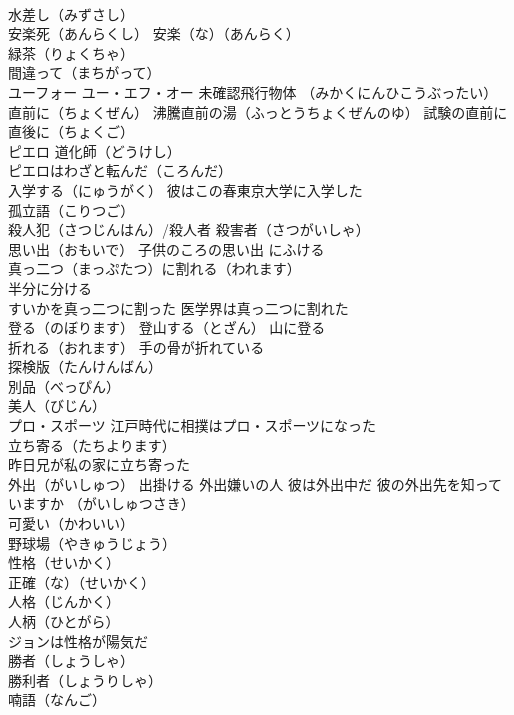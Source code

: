 \documentclass[8pt]{extreport}
\begin{document}
\begin{CJK}{UTF8}{min}
\\	水差し（みずさし）
\\	安楽死（あんらくし） 安楽（な）（あんらく）
\\	緑茶（りょくちゃ）
\\	間違って（まちがって）
\\	ユーフォー ユー・エフ・オー 未確認飛行物体 （みかくにんひこうぶったい） 
\\	直前に（ちょくぜん） 沸騰直前の湯（ふっとうちょくぜんのゆ） 試験の直前に 直後に（ちょくご）
\\	ピエロ 道化師（どうけし）
\\	ピエロはわざと転んだ（ころんだ）
\\	入学する（にゅうがく） 彼はこの春東京大学に入学した
\\	孤立語（こりつご）
\\	殺人犯（さつじんはん）/殺人者 殺害者（さつがいしゃ）
\\	思い出（おもいで） 子供のころの思い出 にふける
\\	真っ二つ（まっぷたつ）に割れる（われます）
\\	半分に分ける
\\	すいかを真っ二つに割った 医学界は真っ二つに割れた
\\	登る（のぼります） 登山する（とざん） 山に登る
\\	折れる（おれます） 手の骨が折れている
\\	探検版（たんけんばん）
\\	別品（べっぴん）
\\	美人（びじん）
\\	プロ・スポーツ 江戸時代に相撲はプロ・スポーツになった
\\	立ち寄る（たちよります） 
\\	昨日兄が私の家に立ち寄った
\\	外出（がいしゅつ） 出掛ける 外出嫌いの人 彼は外出中だ 彼の外出先を知っていますか （がいしゅつさき）
\\	可愛い（かわいい）
\\	野球場（やきゅうじょう）
\\	性格（せいかく） 
\\	正確（な）（せいかく） 
\\	人格（じんかく） 
\\	人柄（ひとがら） 
\\	ジョンは性格が陽気だ
\\	勝者（しょうしゃ） 
\\	勝利者（しょうりしゃ）
\\	喃語（なんご） 

\end{CJK}
\end{document}
